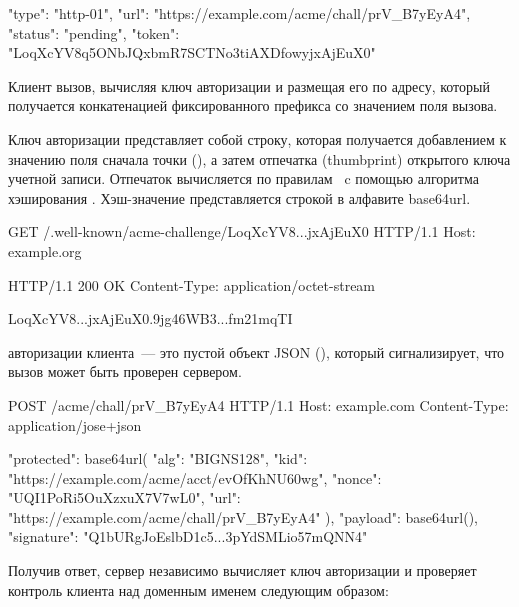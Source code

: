 \begin{codeblock}
{
  "type": "http-01",
  "url": "https://example.com/acme/chall/prV_B7yEyA4",
  "status": "pending",
  "token": "LoqXcYV8q5ONbJQxbmR7SCTNo3tiAXDfowyjxAjEuX0"
}
\end{codeblock}
\fi

Клиент  вызов, вычисляя ключ 
авторизации и размещая его по адресу, который получается конкатенацией 
фиксированного префикса  со значением поля 
 вызова.

Ключ авторизации представляет собой строку, которая получается добавлением к 
значению поля  сначала точки (), а затем отпечатка 
(thumbprint) открытого ключа учетной записи. Отпечаток вычисляется по 
правилам~\cite{RFC7638} c помощью алгоритма хэширования . 
Хэш-значение представляется строкой в алфавите base64url.

%
%

\begin{codeblock}
GET /.well-known/acme-challenge/LoqXcYV8...jxAjEuX0 HTTP/1.1
Host: example.org

HTTP/1.1 200 OK
Content-Type: application/octet-stream

LoqXcYV8...jxAjEuX0.9jg46WB3...fm21mqTI
\end{codeblock}
\fi 

 авторизации клиента~--- это пустой объект 
JSON (\sstr{\{\}}), который сигнализирует, что вызов может быть проверен 
сервером.

\begin{codeblock}
POST /acme/chall/prV_B7yEyA4 HTTP/1.1
Host: example.com
Content-Type: application/jose+json

{
  "protected": base64url({
    "alg": "BIGNS128",
    "kid": "https://example.com/acme/acct/evOfKhNU60wg",
    "nonce": "UQI1PoRi5OuXzxuX7V7wL0",
    "url": "https://example.com/acme/chall/prV_B7yEyA4"
  }),
  "payload": base64url({}),
  "signature": "Q1bURgJoEslbD1c5...3pYdSMLio57mQNN4"
}
\end{codeblock}
\fi

Получив ответ, сервер независимо вычисляет ключ авторизации и 
проверяет контроль клиента над доменным именем следующим образом:

